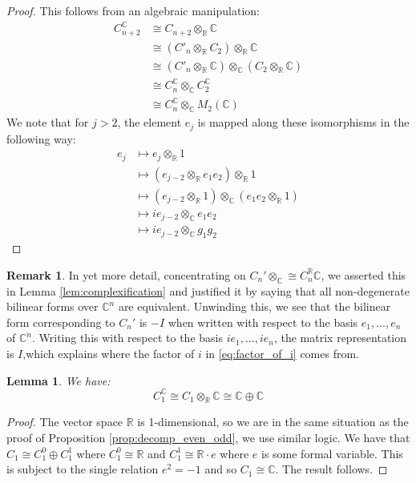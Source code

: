 \documentclass[12pt]{article}
\theoremstyle{plain}
\newtheorem{lemma}[thm]{Lemma}
\theoremstyle{definition}
\newtheorem{remark}[thm]{Remark}
\newcommand{\bb}[1]{\mathbb{#1}}
\begin{document}
\begin{proof}
This follows from an algebraic manipulation:
\begin{align*}
C_{n+2}^{\bb{C}} &\cong C_{n+2} \otimes_{\bb{R}}\bb{C}\\
&\cong (C'_n \otimes_{\bb{R}} C_2) \otimes_{\bb{R}}\bb{C}\\
&\cong (C'_{n}\otimes_{\bb{R}}\bb{C}) \otimes_{\bb{C}} (C_2 \otimes_{\bb{R}} \bb{C})\\
&\cong C_{n}^{\bb{C}} \otimes_{\bb{C}}C_2^{\bb{C}}\\
&\cong C_{n}^{\bb{C}} \otimes_{\bb{C}}M_2(\bb{C})
\end{align*}
We note that for $j > 2$, the element $e_j$ is mapped along these isomorphisms in the following way:
\begin{align}
e_j &\longmapsto e_j \otimes_{\bb{R}} 1\\
&\longmapsto (e_{j-2} \otimes_{\bb{R}} e_1e_2) \otimes_{\bb{R}} 1\\
&\longmapsto (e_{j-2} \otimes_{\bb{R}} 1) \otimes_{\bb{C}} (e_1e_2 \otimes_{\bb{R}} 1)\\
&\label{eq:factor_of_i}\longmapsto ie_{j-2} \otimes_{\bb{C}} e_1e_2\\
&\longmapsto ie_{j-2} \otimes_{\bb{C}} g_1g_2
\end{align}
\end{proof}
\begin{remark}
In yet more detail, concentrating on $C_n' \otimes_{\bb{C}} \cong C_n^{\bb{R}}\bb{C}$, we asserted this in Lemma \ref{lem:complexification} and justified it by saying that all non-degenerate bilinear forms over $\bb{C}^n$ are equivalent. Unwinding this, we see that the bilinear form corresponding to $C_n'$ is $-I$ when written with respect to the basis $e_1,...,e_n$ of $\bb{C}^n$. Writing this with respect to the basis $ie_1,...,ie_n$, the matrix representation is $I$,which explains where the factor of $i$ in \eqref{eq:factor_of_i} comes from.
\end{remark}
\begin{lemma}\label{lem:case_one}
We have:
\begin{equation}
C_1^{\bb{C}} \cong C_1 \otimes_{\bb{R}}\bb{C} \cong \bb{C} \oplus \bb{C}
\end{equation}
\end{lemma}
\begin{proof}
The vector space $\bb{R}$ is 1-dimensional, so we are in the same situation as the proof of Proposition \ref{prop:decomp_even_odd}, we use similar logic. We have that $C_1 \cong C_1^0 \oplus C_1^1$ where $C_1^0 \cong \bb{R}$ and $C_1^1 \cong \bb{R}\cdot e$ where $e$ is some formal variable. This is subject to the single relation $e^2 = -1$ and so $C_1 \cong \bb{C}$. The result follows.
\end{proof}
\end{document}
